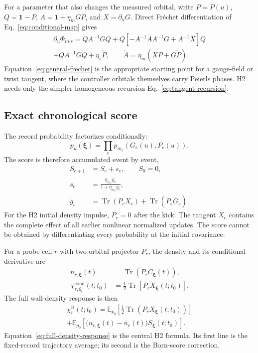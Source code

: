 \documentclass[aps,prb,onecolumn,nofootinbib,superscriptaddress]{revtex4-2}
\newcommand{\Id}{\mathbf{1}}
\newcommand{\Tr}{\operatorname{Tr}}
\newcommand{\E}{\mathbb{E}}
\newcommand{\bxi}{\bm{\xi}}
\newcommand{\cond}{\mathrm{cond}}
\newcommand{\Born}{\mathrm{B}}
\begin{document}
For a parameter that also changes the measured orbital, write
$P=P(u)$, $Q=\Id-P$, $A=\Id+\eta_m GP$, and $X=\partial_uG$.  Direct
Fr\'echet differentiation of Eq.~\eqref{eq:conditional-map} gives
\begin{multline}
  \partial_u\Phi_{m|s}
  =\dot Q A^{-1}GQ
   +Q\left[-A^{-1}\dot A A^{-1}G+A^{-1}X\right]Q\\
   +QA^{-1}G\dot Q+\eta_s\dot P,
  \qquad
  \dot A=\eta_m(XP+G\dot P).
  \label{eq:general-frechet}
\end{multline}
Equation~\eqref{eq:general-frechet} is the appropriate starting point for a
gauge-field or twist tangent, where the controller orbitals themselves carry
Peierls phases.  H2 needs only the simpler homogeneous recursion
Eq.~\eqref{eq:tangent-recursion}.

\subsection{Exact chronological score}

The record probability factorizes conditionally:
\begin{equation}
  p_u(\bxi)=\prod_e p_{m_e}\!\left(G_e(u),P_e(u)\right).
  \label{eq:record-product}
\end{equation}
The score is therefore accumulated event by event,
\begin{align}
  S_{e+1}&=S_e+s_e,\qquad S_0=0,\label{eq:score-recursion}\\
  s_e&=\frac{\eta_{m_e}\dot g_e}{1+\eta_{m_e}g_e},
  \label{eq:binary-score}\\
  \dot g_e&=\Tr(P_eX_e)+\Tr(\dot P_eG_e).
  \label{eq:g-derivative}
\end{align}
For the H2 initial density impulse, $\dot P_e=0$ after the kick.  The tangent
$X_e$ contains the complete effect of all earlier nonlinear normalized
updates.  The score cannot be obtained by differentiating every probability
at the initial covariance.

For a probe cell $r$ with two-orbital projector $P_r$, the density and its
conditional derivative are
\begin{align}
  n_{r,\bxi}(t)&=\Tr(P_rC_{\bxi}(t)),\label{eq:cell-density}\\
  \chi_{r,\bxi}^{\cond}(t;t_0)
  &=\frac12\Tr[P_rX_{\bxi}(t;t_0)].
  \label{eq:density-tangent}
\end{align}
The full wall-density response is then
\begin{multline}
  \chi_{r}^{\Born}(t;t_0)
  =\E_{p_0}\!\left[\frac12\Tr(P_rX_{\bxi}(t;t_0))\right]\\
  +\E_{p_0}\!\left[
  \bigl(n_{r,\bxi}(t)-\bar n_r(t)\bigr)S_{\bxi}(t;t_0)
  \right].
  \label{eq:full-density-response}
\end{multline}
Equation~\eqref{eq:full-density-response} is the central H2 formula.  Its first
line is the fixed-record trajectory average; its second is the Born-score
correction.
\end{document}
